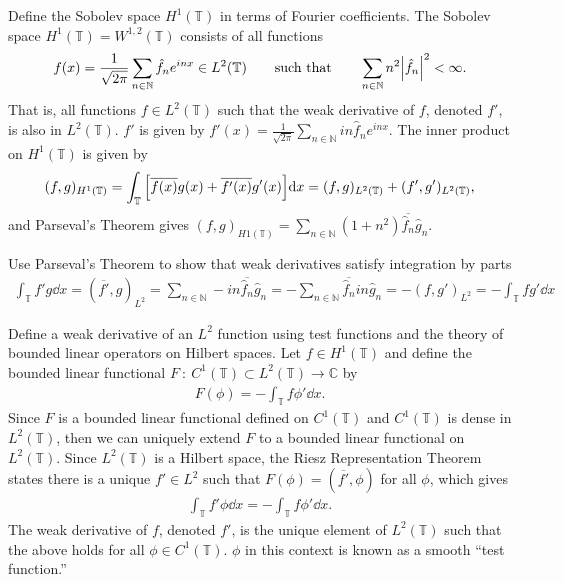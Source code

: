 \documentclass[avery5388,grid,frame]{flashcards}
\def\Cx{\mathbb{C}}
\def\torus{\mathbb{T}}
\begin{document}
\begin{flashcard}
    {Define the Sobolev space $H^1(\torus)$ in terms of Fourier coefficients.}
    The Sobolev space $H^1(\torus) = W^{1,2}(\torus)$ consists of all functions
    \begin{align*}
        f(x) = \frac{1}{\sqrt{2\pi}}\sum_{n \in \mathbb{N}}\hat{f}_n e^{inx} \in L^2(\torus) \qquad \text{such that} \qquad \sum_{n \in \mathbb{N}} n^2 \abs{\hat{f}_n}^2 < \infty.
    \end{align*}
    That is, all functions $f \in L^2(\torus)$ such that the weak derivative of $f$, denoted $f'$, is also in $L^2(\torus)$.  $f'$ is given by $\displaystyle f'(x) = \frac{1}{\sqrt{2\pi}}\sum_{n\in\mathbb{N}}in\hat{f}_n e^{inx}$.
    The inner product on $H^1(\torus)$ is given by
    \begin{align*}
        (f, g)_{H^1(\torus)} = \int_\torus \qty[\overline{f(x)}g(x) + \overline{f'(x)}g'(x)]\dd x = (f, g)_{L^2(\torus)} + (f', g')_{L^2(\torus)},
    \end{align*}
    and Parseval's Theorem gives $\displaystyle (f,g)_{H1(\torus)} = \sum_{n\in\mathbb{N}}(1 + n^2)\overline{\hat{f}_n}\hat{g}_n$.
\end{flashcard}

\begin{flashcard}
    {Use Parseval's Theorem to show that weak derivatives satisfy integration by parts}
    \begin{align*}
        \int_\torus f'g \dd x = (\overline{f'},g)_{L^2} = \sum_{n\in\mathbb{N}}-in\overline{\hat{f}_n}\hat{g}_n = -\sum_{n\in\mathbb{N}}\overline{\hat{f}_n}in\hat{g}_n = -(f,g')_{L^2} = -\int_\torus fg' \dd x
    \end{align*}
\end{flashcard}

\begin{flashcard}
    {Define a weak derivative of an $L^2$ function using test functions and the theory of bounded linear operators on Hilbert spaces.}
    Let $f \in H^1(\torus)$ and define the bounded linear functional $F\ :\ C^1(\torus) \subset L^2(\torus) \rightarrow \Cx$ by
    \vspace{-10pt}
    \begin{align*}
        F(\phi) = -\int_\torus f \phi' \dd x.
    \end{align*}
    Since $F$ is a bounded linear functional defined on $C^1(\torus)$ and $C^1(\torus)$ is dense in $L^2(\torus)$, then we can uniquely extend $F$ to a bounded linear functional on $L^2(\torus)$.  Since $L^2(\torus)$ is a Hilbert space, the Riesz Representation Theorem states there is a unique $f' \in L^2$ such that $F(\phi) = (\overline{f'}, \phi)$ for all $\phi$, which gives
    \begin{align*}
        \int_\torus f'\phi\dd x = - \int_\torus f \phi' \dd x.
    \end{align*}
    The weak derivative of $f$, denoted $f'$, is the unique element of $L^2(\torus)$ such that the above holds for all $\phi \in C^1(\torus)$.  $\phi$ in this context is known as a smooth ``test function.''
\end{flashcard}
\end{document}
